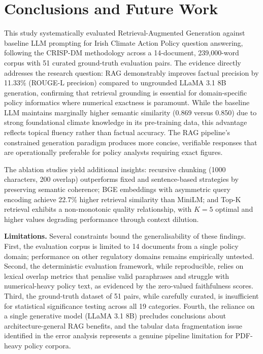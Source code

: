 \documentclass[conference]{IEEEtran}
\begin{document}
\section{Conclusions and Future Work}

This study systematically evaluated Retrieval-Augmented Generation against baseline LLM prompting for Irish Climate Action Policy question answering, following the CRISP-DM methodology across a 14-document, 239,000-word corpus with 51 curated ground-truth evaluation pairs. The evidence directly addresses the research question: RAG demonstrably improves factual precision by 11.33\% (ROUGE-L precision) compared to ungrounded LLaMA 3.1 8B generation, confirming that retrieval grounding is essential for domain-specific policy informatics where numerical exactness is paramount. While the baseline LLM maintains marginally higher semantic similarity (0.869 versus 0.850) due to strong foundational climate knowledge in its pre-training data, this advantage reflects topical fluency rather than factual accuracy. The RAG pipeline's constrained generation paradigm produces more concise, verifiable responses that are operationally preferable for policy analysts requiring exact figures.

The ablation studies yield additional insights: recursive chunking (1000 characters, 200 overlap) outperforms fixed and sentence-based strategies by preserving semantic coherence; BGE embeddings with asymmetric query encoding achieve 22.7\% higher retrieval similarity than MiniLM; and Top-K retrieval exhibits a non-monotonic quality relationship, with $K{=}5$ optimal and higher values degrading performance through context dilution.

\textbf{Limitations.} Several constraints bound the generalisability of these findings. First, the evaluation corpus is limited to 14 documents from a single policy domain; performance on other regulatory domains remains empirically untested. Second, the deterministic evaluation framework, while reproducible, relies on lexical overlap metrics that penalise valid paraphrases and struggle with numerical-heavy policy text, as evidenced by the zero-valued faithfulness scores. Third, the ground-truth dataset of 51 pairs, while carefully curated, is insufficient for statistical significance testing across all 19 categories. Fourth, the reliance on a single generative model (LLaMA 3.1 8B) precludes conclusions about architecture-general RAG benefits, and the tabular data fragmentation issue identified in the error analysis represents a genuine pipeline limitation for PDF-heavy policy corpora.
\end{document}
